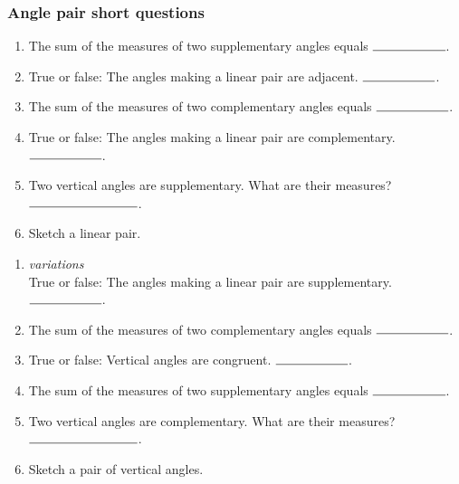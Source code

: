 \documentclass[12pt, oneside]{article}
\begin{document}
\subsubsection*{Angle pair short questions}
  \begin{enumerate}
    \item The sum of the measures of two supplementary angles equals $\rule{2cm}{0.15mm}$. \bigskip
    \item True or false: The angles making a linear pair are adjacent. $\rule{2cm}{0.15mm}$. \bigskip
    \item The sum of the measures of two complementary angles equals $\rule{2cm}{0.15mm}$. \bigskip
    \item True or false: The angles making a linear pair are complementary. $\rule{2cm}{0.15mm}$. \bigskip
    \item Two vertical angles are supplementary. What are their measures? $\rule{3cm}{0.15mm}$. \bigskip
    \item Sketch a linear pair.
    \end{enumerate}

  \begin{enumerate}
    \item \emph{variations}\\ True or false: The angles making a linear pair are supplementary. $\rule{2cm}{0.15mm}$. \bigskip
    \item The sum of the measures of two complementary angles equals $\rule{2cm}{0.15mm}$. \bigskip
    \item True or false: Vertical angles are congruent. $\rule{2cm}{0.15mm}$. \bigskip
    \item The sum of the measures of two supplementary angles equals $\rule{2cm}{0.15mm}$. \bigskip
    \item Two vertical angles are complementary. What are their measures? $\rule{3cm}{0.15mm}$. \bigskip
    \item Sketch a pair of vertical angles. \vspace{3cm}
    \end{enumerate}
\end{document}
